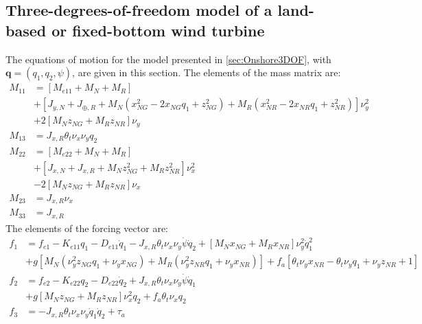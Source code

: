 \documentclass[wes, manuscript]{copernicus}
\renewcommand{\v}[1]{\boldsymbol{#1}}
\begin{document}
\subsection{Three-degrees-of-freedom model of a land-based or fixed-bottom wind turbine}
\label{sec:Onshore3DOFEq}
The equations of motion for the model presented in \autoref{sec:Onshore3DOF}, with $\v{q}=(q_1,q_2,\psi)$, are given in this section.
The elements of the mass matrix are:
\begin{align}
    M_{11} &= \left[M_{e11}+ M_N + M_{R} \right]
        \\
       &+ \left[J_{y,N} + J_{\oplus,R} 
       + M_N\left(x_{NG}^{2} - 2 x_{NG} q_1 + z_{NG}^{2}\right)
       + M_{R} \left(x_{NR}^{2} - 2 x_{NR} q_1 + z_{NR}^{2}\right)
    \right] \nu_y^{2}
       \label{eq:GMEx1}
       \\
    &+ 2 \left[M_N z_{NG} + M_{R} z_{NR} \right]   \nu_{y} 
   \\
  M_{13} &= J_{x,R} \theta_t \nu_x \nu_y q_2
  \\
  M_{22} &= \left[M_{e22} + M_N + M_{R} \right]
  \\
         &+ \left[J_{x,N} + J_{x,R} + M_N z_{NG}^{2} + M_{R} z_{NR}^{2}\right] \nu_x^2
  \\
         & -2 \left[M_N z_{NG} + M_{R} z_{NR} \right]\nu_x
  \\
 M_{23} &= J_{x,R} \nu_x 
   \\
 M_{33} & =J_{x,R}
\end{align}
The elements of the forcing vector are:
\begin{align}
f_1 &=
   f_{e1}- K_{e11} q_1 - D_{e11} \dot{q}_1 - J_{x,R} \theta_t \nu_x \nu_y \dot{\psi} \dot{q}_2  
    + \left[M_N x_{NG} + M_{R}  x_{NR}\right] \nu_y^2 \dot{q}_1^{2}
    \\
   &+ g\left[
       M_N\left(\nu_y^{2} z_{NG} q_1 + \nu_y x_{NG}\right)
      +M_R\left(\nu_y^{2} z_{NR} q_1 + \nu_y x_{NR}\right)
           \right] 
    + f_a \left[\theta_t \nu_y x_{NR}  - \theta_t \nu_y q_1 + \nu_y z_{NR}  + 1\right]
\\ 
f_2 &=f_{e2} - K_{e22} q_2 - D_{e22} \dot{q}_2 + J_{x,R} \theta_t \nu_x \nu_y \dot{\psi} \dot{q}_1  
\\
    & +  g \left[M_N z_{NG} + M_{R} z_{NR} \right]\nu_x^{2} q_2 + f_a \theta_t \nu_x q_2
\\ 
f_3 &= - J_{x,R} \theta_t \nu_x \nu_y \dot{q}_1 \dot{q}_2 + \tau_a
\end{align}
\end{document}
